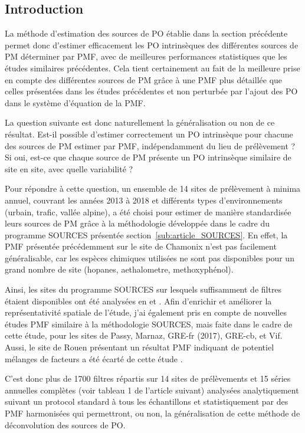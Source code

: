 \subsection{Introduction}%
\label{sub:introduction_synthèse_nationale}

La méthode d'estimation des sources de PO établie dans la section précédente permet donc
d'estimer efficacement les PO intrinsèques des différentes sources de PM déterminer par
PMF, avec de meilleures performances statistiques que les études similaires précédentes.
Cela tient certainement au fait de la meilleure prise en compte des différentes sources de
PM grâce à une PMF plus détaillée que celles présentées dans les études précédentes et non
perturbée par l'ajout des PO dans le système d'équation de la PMF.

La question suivante est donc naturellement la généralisation ou non de ce résultat.
Est-il possible d'estimer correctement un PO intrinsèque pour chacune des sources de PM
estimer par PMF, indépendamment du lieu de prélèvement ? Si oui, est-ce que chaque source
de PM présente un PO intrinsèque similaire de site en site, avec quelle variabilité ?

Pour répondre à cette question, un ensemble de 14 sites de prélèvement à minima annuel, couvrant les
années 2013 à 2018 et différents types d'environnements (urbain, trafic, vallée alpine),
a été choisi pour estimer de manière standardisée leurs sources de PM grâce à la
méthodologie développée dans le cadre du programme SOURCES présentée
section~\ref{sub:article_SOURCES}. En effet, la PMF présentée précédemment sur le site de
Chamonix n'est pas facilement généralisable, car les espèces chimiques utilisées ne sont
pas disponibles pour un grand nombre de site (hopanes, aethalometre, methoxyphénol).

Ainsi, les sites du programme SOURCES sur lesquels suffisamment de filtres étaient
disponibles ont été analysées en \POAA{} et \PODTT{}. Afin d'enrichir et améliorer la
représentativité spatiale de l'étude, j'ai également pris en compte de nouvelles études
PMF similaire à la méthodologie SOURCES, mais faite dans le cadre de cette étude, pour les
sites de Passy, Marnaz, GRE-fr (2017), GRE-cb, et Vif.
Aussi, le site de Rouen présentant un résultat PMF indiquant de potentiel mélanges de
facteurs a été écarté de cette étude \autocite{weberComparison2019}.

C'est donc plus de 1700 filtres répartis sur 14 sites de prélèvements et 15 séries
annuelles complètes (voir tableau 1 de l'article suivant) analysées analytiquement suivant
un protocol standard à tous les échantillons et statistiquement par des PMF harmonisées
qui permettront, ou non, la généralisation de cette méthode de déconvolution des sources
de PO.


